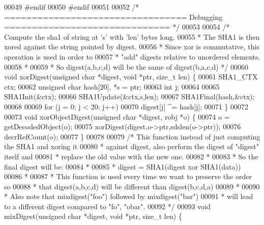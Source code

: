 \begin{DoxyCode}
00049 \textcolor{preprocessor}{#}\textcolor{preprocessor}{endif}
00050 \textcolor{preprocessor}{#}\textcolor{preprocessor}{endif}
00051 
00052 \textcolor{comment}{/* ================================= Debugging ============================== */}
00053 
00054 \textcolor{comment}{/* Compute the sha1 of string at 's' with 'len' bytes long.}
00055 \textcolor{comment}{ * The SHA1 is then xored against the string pointed by digest.}
00056 \textcolor{comment}{ * Since xor is commutative, this operation is used in order to}
00057 \textcolor{comment}{ * "add" digests relative to unordered elements.}
00058 \textcolor{comment}{ *}
00059 \textcolor{comment}{ * So digest(a,b,c,d) will be the same of digest(b,a,c,d) */}
00060 \textcolor{keywordtype}{void} xorDigest(\textcolor{keywordtype}{unsigned} \textcolor{keywordtype}{char} *digest, \textcolor{keywordtype}{void} *ptr, size\_t len) \{
00061     SHA1\_CTX ctx;
00062     \textcolor{keywordtype}{unsigned} \textcolor{keywordtype}{char} hash[20], *s = ptr;
00063     \textcolor{keywordtype}{int} j;
00064 
00065     SHA1Init(&ctx);
00066     SHA1Update(&ctx,s,len);
00067     SHA1Final(hash,&ctx);
00068 
00069     \textcolor{keywordflow}{for} (j = 0; j < 20; j++)
00070         digest[j] ^= hash[j];
00071 \}
00072 
00073 \textcolor{keywordtype}{void} xorObjectDigest(\textcolor{keywordtype}{unsigned} \textcolor{keywordtype}{char} *digest, robj *o) \{
00074     o = getDecodedObject(o);
00075     xorDigest(digest,o->ptr,sdslen(o->ptr));
00076     decrRefCount(o);
00077 \}
00078 
00079 \textcolor{comment}{/* This function instead of just computing the SHA1 and xoring it}
00080 \textcolor{comment}{ * against digest, also perform the digest of "digest" itself and}
00081 \textcolor{comment}{ * replace the old value with the new one.}
00082 \textcolor{comment}{ *}
00083 \textcolor{comment}{ * So the final digest will be:}
00084 \textcolor{comment}{ *}
00085 \textcolor{comment}{ * digest = SHA1(digest xor SHA1(data))}
00086 \textcolor{comment}{ *}
00087 \textcolor{comment}{ * This function is used every time we want to preserve the order so}
00088 \textcolor{comment}{ * that digest(a,b,c,d) will be different than digest(b,c,d,a)}
00089 \textcolor{comment}{ *}
00090 \textcolor{comment}{ * Also note that mixdigest("foo") followed by mixdigest("bar")}
00091 \textcolor{comment}{ * will lead to a different digest compared to "fo", "obar".}
00092 \textcolor{comment}{ */}
00093 \textcolor{keywordtype}{void} mixDigest(\textcolor{keywordtype}{unsigned} \textcolor{keywordtype}{char} *digest, \textcolor{keywordtype}{void} *ptr, size\_t len) \{

\end{DoxyCode}
